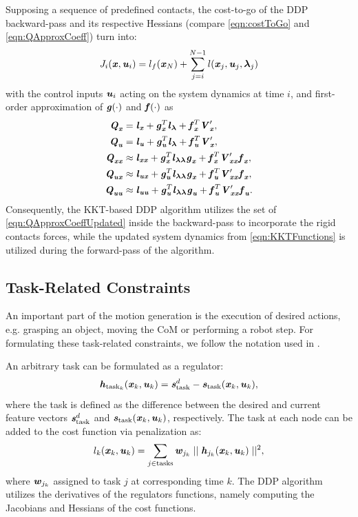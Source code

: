 Supposing a sequence of predefined contacts, the cost-to-go of the \gls{DDP} backward-pass and its respective Hessians (compare \cref{eqn:costToGo} and \ref{eqn:QApproxCoeff}) turn into:
\begin{equation*}\label{eqn:CostToGoUpdated}
J_i(\bm{\mathit{x}}, \bm{\mathit{u}}_i)=l_f(\bm{\mathit{x}}_N)+\sum_{j=i}^{N-1}l(\bm{\mathit{x}}_j,\bm{\mathit{u}}_j,\bm{\mathit{\lambda}}_j)
\end{equation*}
with the control inputs $\bm{\mathit{u}}_i$ acting on the system dynamics at time $i$, and first-order approximation of $\bm{\mathit{g}}(\cdot)$ and $\bm{\mathit{f}}(\cdot)$ as
\begin{align}\label{eqn:QApproxCoeffUpdated}
\begin{split}
\bm{\mathit{Q}}_{\bm{\mathit{x}}} &= \bm{\mathit{l}}_{\bm{\mathit{x}}}+\bm{\mathit{g}}_{\bm{\mathit{x}}}^T\bm{\mathit{l}}_{\bm{\mathit{\lambda}}}+\bm{\mathit{f}}_{\bm{\mathit{x}}}^T \bm{\mathit{V}}_{\bm{\mathit{x}}}^\prime, \\
\bm{\mathit{Q}}_{\bm{\mathit{u}}} &= \bm{\mathit{l}}_{\bm{\mathit{u}}}+\bm{\mathit{g}}_{\bm{\mathit{u}}}^T\bm{\mathit{l}}_{\bm{\mathit{\lambda}}}+\bm{\mathit{f}}_{\bm{\mathit{u}}}^T \bm{\mathit{V}}_{\bm{\mathit{x}}}^\prime, \\
\bm{\mathit{Q}}_{\bm{\mathit{x}}\bm{\mathit{x}}} &\approx \bm{\mathit{l}}_{\bm{\mathit{x}}\bm{\mathit{x}}}+\bm{\mathit{g}}_{\bm{\mathit{x}}}^T\bm{\mathit{l}}_{\bm{\mathit{\lambda\lambda}}}\bm{\mathit{g}}_{\bm{\mathit{x}}}+\bm{\mathit{f}}_{\bm{\mathit{x}}}^T \bm{\mathit{V}}_{\bm{\mathit{x}}\bm{\mathit{x}}}^\prime\bm{\mathit{f}}_{\bm{\mathit{x}}},\\
\bm{\mathit{Q}}_{\bm{\mathit{u}}\bm{\mathit{x}}} &\approx \bm{\mathit{l}}_{\bm{\mathit{u}}\bm{\mathit{x}}}+\bm{\mathit{g}}_{\bm{\mathit{u}}}^T\bm{\mathit{l}}_{\bm{\mathit{\lambda\lambda}}}\bm{\mathit{g}}_{\bm{\mathit{x}}}+\bm{\mathit{f}}_{\bm{\mathit{u}}}^T \bm{\mathit{V}}_{\bm{\mathit{x}}\bm{\mathit{x}}}^\prime\bm{\mathit{f}}_{\bm{\mathit{x}}},\\
\bm{\mathit{Q}}_{\bm{\mathit{u}}\bm{\mathit{u}}} &\approx \bm{\mathit{l}}_{\bm{\mathit{u}}\bm{\mathit{u}}}+\bm{\mathit{g}}_{\bm{\mathit{u}}}^T\bm{\mathit{l}}_{\bm{\mathit{\lambda\lambda}}}\bm{\mathit{g}}_{\bm{\mathit{u}}}+\bm{\mathit{f}}_{\bm{\mathit{u}}}^T \bm{\mathit{V}}_{\bm{\mathit{x}}\bm{\mathit{x}}}^\prime\bm{\mathit{f}}_{\bm{\mathit{u}}}.
\end{split}
\end{align}
Consequently, the \gls{KKT}-based \gls{DDP} algorithm utilizes the set of \cref{eqn:QApproxCoeffUpdated} inside the backward-pass to incorporate the rigid contacts forces, while the updated system dynamics from \cref{eqn:KKTFunctions} is utilized during the forward-pass of the algorithm. 

\subsection{Task-Related Constraints}
An important part of the motion generation is the execution of desired actions, e.g. grasping an object, moving the \gls{CoM} or performing a robot step. For formulating these task-related constraints, we follow the notation used in \cite{giraud2020motion}.

An arbitrary task can be formulated as a regulator: 
\begin{equation*} 
\bm{\mathit{h}}_{\text{task}_k}(\bm{\mathit{x}}_k,\bm{\mathit{u}}_k)=\bm{\mathit{s}}_{\text{task}}^d-\bm{\mathit{s}}_{\text{task}}(\bm{\mathit{x}}_k,\bm{\mathit{u}}_k),
\end{equation*}   
where the task is defined as the difference between the desired and current feature vectors $\bm{\mathit{s}}_{\text{task}}^d$ and $\bm{\mathit{s}}_{\text{task}}(\bm{\mathit{x}}_k,\bm{\mathit{u}}_k)$, respectively. The task at each node can be added to the cost function via penalization as: 
\begin{equation*} 
l_k(\bm{\mathit{x}}_k,\bm{\mathit{u}}_k)=\sum_{j\in \text{tasks}}\bm{\mathit{w}}_{j_k}\mid\mid\bm{\mathit{h}}_{j_k}(\bm{\mathit{x}}_k,\bm{\mathit{u}}_k)\mid\mid^2,
\end{equation*}  
where $\bm{\mathit{w}}_{j_k}$ assigned to task $j$ at corresponding time $k$. The \gls{DDP} algorithm utilizes the derivatives of the regulators functions, namely computing the Jacobians and Hessians of the cost functions. 

